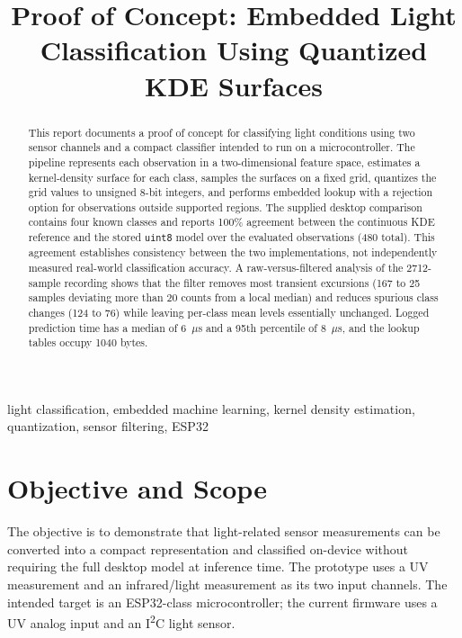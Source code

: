 \documentclass[conference]{IEEEtran}
\title{Proof of Concept: Embedded Light Classification Using Quantized KDE Surfaces}
\author{\IEEEauthorblockN{Mauricio Chacin}
\IEEEauthorblockA{Project 1 -- Proof of Concept Report\\
October 2026}}
\begin{document}
\maketitle

\begin{abstract}
This report documents a proof of concept for classifying light conditions using two sensor channels and a compact classifier intended to run on a microcontroller. The pipeline represents each observation in a two-dimensional feature space, estimates a kernel-density surface for each class, samples the surfaces on a fixed grid, quantizes the grid values to unsigned 8-bit integers, and performs embedded lookup with a rejection option for observations outside supported regions. The supplied desktop comparison contains four known classes and reports 100\% agreement between the continuous KDE reference and the stored \texttt{uint8} model over the evaluated observations (480 total). This agreement establishes consistency between the two implementations, not independently measured real-world classification accuracy. A raw-versus-filtered analysis of the 2712-sample recording shows that the filter removes most transient excursions (167 to 25 samples deviating more than 20 counts from a local median) and reduces spurious class changes (124 to 76) while leaving per-class mean levels essentially unchanged. Logged prediction time has a median of 6~$\mu$s and a 95th percentile of 8~$\mu$s, and the lookup tables occupy 1040 bytes.
\end{abstract}

\begin{IEEEkeywords}
light classification, embedded machine learning, kernel density estimation, quantization, sensor filtering, ESP32
\end{IEEEkeywords}

\section{Objective and Scope}
The objective is to demonstrate that light-related sensor measurements can be converted into a compact representation and classified on-device without requiring the full desktop model at inference time. The prototype uses a UV measurement and an infrared/light measurement as its two input channels. The intended target is an ESP32-class microcontroller; the current firmware uses a UV analog input and an I\textsuperscript{2}C light sensor.
\end{document}
